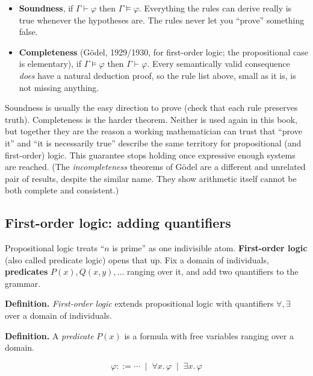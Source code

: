 \begin{itemize}
\tightlist
\item
  \textbf{Soundness}, if \(\Gamma \vdash \varphi\) then \(\Gamma \models \varphi\). Everything the rules can derive really is true whenever the hypotheses are. The rules never let you ``prove'' something false.
\item
  \textbf{Completeness} (Gödel, 1929/1930, for first-order logic; the propositional case is elementary), if \(\Gamma \models \varphi\) then \(\Gamma \vdash
  \varphi\). Every semantically valid consequence \emph{does} have a natural deduction proof, so the rule list above, small as it is, is not missing anything.
\end{itemize}

Soundness is usually the easy direction to prove (check that each rule preserves truth). Completeness is the harder theorem. Neither is used again in this book, but together they are the reason a working mathematician can trust that ``prove it'' and ``it is necessarily true'' describe the same territory for propositional (and first-order) logic. This guarantee stops holding once expressive enough systems are reached. (The \emph{incompleteness} theorems of Gödel are a different and unrelated pair of results, despite the similar name. They show arithmetic itself cannot be both complete and consistent.)

\subsection{First-order logic: adding quantifiers}\label{sec:04-propositions-and-proofs:02-logic-recap:6}

Propositional logic treats ``\(n\) is prime'' as one indivisible atom. \textbf{First-order logic} (also called predicate logic) opens that up. Fix a domain of individuals, \textbf{predicates} \(P(x), Q(x, y), \dots\) ranging over it, and add two quantifiers to the grammar.

\textbf{Definition.} \emph{First-order logic} extends propositional logic with quantifiers \(\forall, \exists\) over a domain of individuals.

\textbf{Definition.} A \emph{predicate} \(P(x)\) is a formula with free variables ranging over a domain.

\[
\varphi ::= \cdots \;\mid\; \forall x.\, \varphi \;\mid\; \exists x.\, \varphi
\]


